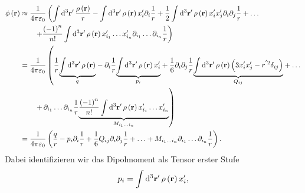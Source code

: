\begin{align*}
	\phi \left(\vec {r}\right) & \approx \frac{1}{4\pi \varepsilon _{0}}\left(\int \diffa[3]{\vec{r}'}\frac{\rho \left(\vec {r}\right)}{r}-\int \diffa[3]{\vec{r}'}\rho \left(\vec {r}\right)x_{i}'\partial _{i}\frac{1}{r}+\frac{1}{2}\int \diffa[3]{\vec{r}'}\rho \left(\vec {r}\right)x_{i}'x_{j}'\partial _{i}\partial _{j}\frac{1}{r}+\ldots \right.                                                                                                                      \\
	                           & \quad\quad\left. +\frac{\left(-1\right)^{n}}{n!}\int \diffa[3]{\vec{r}'}\rho \left(\vec {r}\right)x_{i_{1}}'\ldots  x_{i_{n}}'\partial _{{i_{1}}}\ldots \partial _{{i_{n}}}\frac{1}{r}\right)                                                                                                                                                                                                                                                 \\
	                           & =\frac{1}{4\pi \varepsilon _{0}}\left(\frac{1}{r}\underset{q}{\underbrace{\int \diffa[3]{\vec{r}'}\rho \left(\vec {r}\right)}}-\partial _{i}\frac{1}{r}\underset{p_{i}}{\underbrace{\int \diffa[3]{\vec{r}'}\rho \left(\vec {r}\right)x_{i}'}}+\frac{1}{6}\partial _{i}\partial _{j}\frac{1}{r}\underset{Q_{ij}}{\underbrace{\int \diffa[3]{\vec{r}'}\rho \left(\vec {r}\right)\left(3x_{i}'x_{j}'-r^{'2}\delta _{ij}\right)}}+\ldots \right. \\
	                           & \quad\quad\left.  +\,\partial _{{i_{1}}}\ldots \partial _{{i_{n}}}\frac{1}{r}\underset{M_{{i_{1}}\ldots {i_{n}}}}{\underbrace{\frac{\left(-1\right)^{n}}{n!}\int \diffa[3]{\vec{r}'}\rho \left(\vec {r}\right)x_{i_{1}}'\ldots x_{i_{n}}'}}\right)                                                                                                                                                                                            \\
	                           & =\frac{1}{4\pi \varepsilon _{0}}\left(\frac{q}{r}-p_{i}\partial _{i}\frac{1}{r}+\frac{1}{6}Q_{ij}\partial _{i}\partial _{j}\frac{1}{r}+\ldots +M_{{i_{1}}\ldots {i_{n}}}\partial _{{i_{1}}}\ldots \partial _{{i_{n}}}\frac{1}{r}\right).
\end{align*}
Dabei identifizieren wir das Dipolmoment als Tensor erster Stufe
\begin{equation*}
	p_{i}=\int \diffa[3]{\vec{r}'}\rho \left(\vec {r}\right)x_{i}',
\end{equation*}
